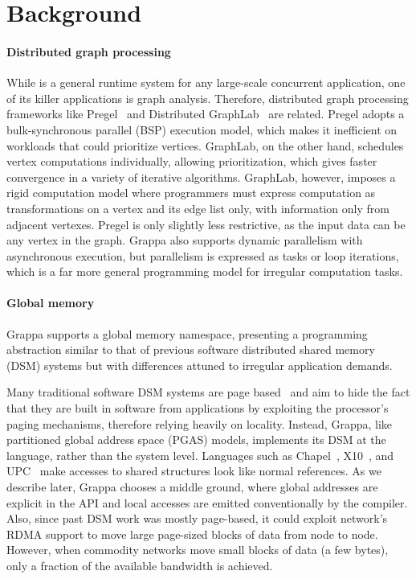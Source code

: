 \section{Background}



\paragraph{Distributed graph processing} While \Grappa is a general runtime
system for any large-scale concurrent application, one of its killer
applications is graph analysis. Therefore, distributed graph processing
frameworks like Pregel~\cite{pregel:2010} and Distributed
GraphLab~\cite{distgraphlab:vldb12} are related. Pregel adopts a
bulk-synchronous parallel (BSP) execution model, which makes it inefficient on
workloads that could prioritize vertices. GraphLab, on the other hand,
schedules vertex computations individually, allowing prioritization, which
gives faster convergence in a variety of iterative algorithms. GraphLab,
however, imposes a rigid computation model where programmers must express
computation as transformations on a vertex and its edge list only, with
information only from adjacent vertexes. Pregel is only slightly less
restrictive, as the input data can be any vertex in the graph. Grappa also
supports dynamic parallelism with asynchronous execution, but parallelism is
expressed as tasks or loop iterations, which is a far more general programming
model for irregular computation tasks.

\paragraph{Global memory} Grappa supports a global memory namespace, presenting a programming abstraction similar to that of previous software distributed shared memory (DSM) systems but with differences attuned to irregular application demands.

Many traditional software DSM systems are page based~\cite{Treadmarks,munin}
and aim to hide the fact that they are built in software from applications by
exploiting the processor's paging mechanisms, therefore relying heavily on
locality. Instead, Grappa, like partitioned global address space (PGAS)
models, implements its DSM at the language, rather than the system level.
Languages such as Chapel~\cite{Chamberlain:2007}, X10~\cite{X10:2005}, and
UPC~\cite{upc:2005} make accesses to shared structures look like normal
references. As we describe later, Grappa chooses a middle ground, where global
addresses are explicit in the API and local accesses are emitted
conventionally by the compiler. Also, since past DSM work was mostly
page-based, it could exploit network's RDMA support to move large page-sized
blocks of data from node to node. However, when commodity networks move small
blocks of data (a few bytes), only a fraction of the available bandwidth is
achieved. 

